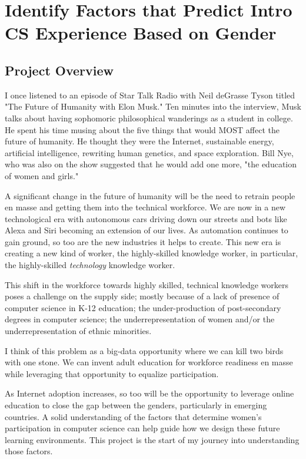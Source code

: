 
\chapter*{Identify Factors that Predict Intro CS Experience Based on Gender}

\section*{Project Overview}

I once listened to an episode of Star Talk Radio with Neil deGrasse Tyson titled "The Future of Humanity with Elon Musk." Ten minutes into the interview, Musk talks about having sophomoric philosophical wanderings as a student in college. He spent his time musing about the five things that would MOST affect the future of humanity. He thought they were the Internet, sustainable energy, artificial intelligence, rewriting human genetics, and space exploration. Bill Nye, who was also on the show suggested that he would add one more, "the education of women and girls."

A significant change in the future of humanity will be the need to retrain people en masse and getting them into the technical workforce. We are now in a new technological era with autonomous cars driving down our streets and bots like Alexa and Siri becoming an extension of our lives. As automation continues to gain ground, so too are the new industries it helps to create. This new era is creating a new kind of worker, the highly-skilled knowledge worker, in particular, the highly-skilled \emph{technology} knowledge worker.

This shift in the workforce towards highly skilled, technical knowledge workers poses a challenge on the supply side; mostly because of a lack of presence of computer science in K-12 education; the under-production of post-secondary degrees in computer science;  the underrepresentation of women and/or the underrepresentation of ethnic minorities. 

I think of this problem as a big-data opportunity where we can kill two birds with one stone. We can invent adult education for workforce readiness en masse while leveraging that opportunity to equalize participation.

As Internet adoption increases, so too will be the opportunity to leverage online education to close the gap between the genders, particularly in emerging countries. A solid understanding of the factors that determine women's participation in computer science can help guide how we design these future learning environments.  This project is the start of my journey into understanding those factors.

